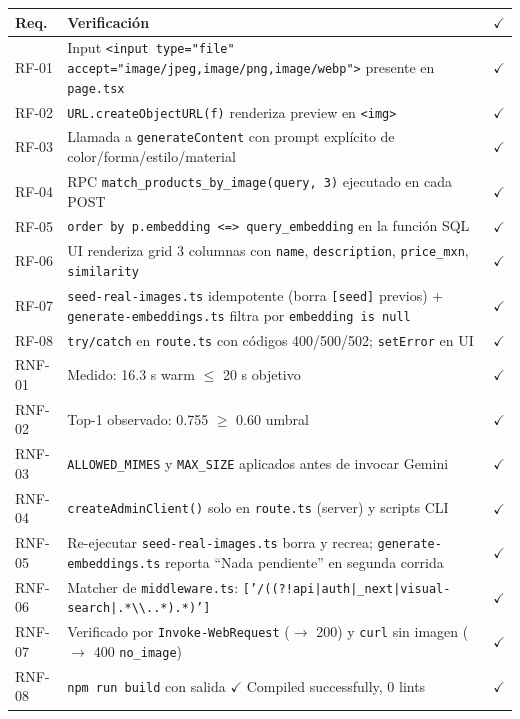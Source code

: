 \documentclass[11pt,letterpaper]{article}
\begin{document}
\begin{longtable}{@{}l p{8.5cm} c@{}}
\toprule
\textbf{Req.} & \textbf{Verificación} & \textbf{$\checkmark$} \\
\midrule
\endhead
RF-01 & Input \texttt{<input type="file" accept="image/jpeg,image/png,image/webp">} presente en \texttt{page.tsx} & $\checkmark$ \\
RF-02 & \texttt{URL.createObjectURL(f)} renderiza preview en \texttt{<img>} & $\checkmark$ \\
RF-03 & Llamada a \texttt{generateContent} con prompt explícito de color/forma/estilo/material & $\checkmark$ \\
RF-04 & RPC \texttt{match\_products\_by\_image(query, 3)} ejecutado en cada POST & $\checkmark$ \\
RF-05 & \texttt{order by p.embedding <=> query\_embedding} en la función SQL & $\checkmark$ \\
RF-06 & UI renderiza grid 3 columnas con \texttt{name}, \texttt{description}, \texttt{price\_mxn}, \texttt{similarity} & $\checkmark$ \\
RF-07 & \texttt{seed-real-images.ts} idempotente (borra \texttt{[seed]} previos) + \texttt{generate-embeddings.ts} filtra por \texttt{embedding is null} & $\checkmark$ \\
RF-08 & \texttt{try/catch} en \texttt{route.ts} con códigos 400/500/502; \texttt{setError} en UI & $\checkmark$ \\
RNF-01 & Medido: 16.3 s warm $\leq$ 20 s objetivo & $\checkmark$ \\
RNF-02 & Top-1 observado: 0.755 $\geq$ 0.60 umbral & $\checkmark$ \\
RNF-03 & \texttt{ALLOWED\_MIMES} y \texttt{MAX\_SIZE} aplicados antes de invocar Gemini & $\checkmark$ \\
RNF-04 & \texttt{createAdminClient()} solo en \texttt{route.ts} (server) y scripts CLI & $\checkmark$ \\
RNF-05 & Re-ejecutar \texttt{seed-real-images.ts} borra y recrea; \texttt{generate-embeddings.ts} reporta ``Nada pendiente'' en segunda corrida & $\checkmark$ \\
RNF-06 & Matcher de \texttt{middleware.ts}: \texttt{['/((?!api|auth|\_next|visual-search|.*\textbackslash\textbackslash..*).*)']} & $\checkmark$ \\
RNF-07 & Verificado por \texttt{Invoke-WebRequest} ($\rightarrow$ 200) y \texttt{curl} sin imagen ($\rightarrow$ 400 \texttt{no\_image}) & $\checkmark$ \\
RNF-08 & \texttt{npm run build} con salida $\checkmark$ Compiled successfully, 0 lints & $\checkmark$ \\
\bottomrule
\end{longtable}
\end{document}
